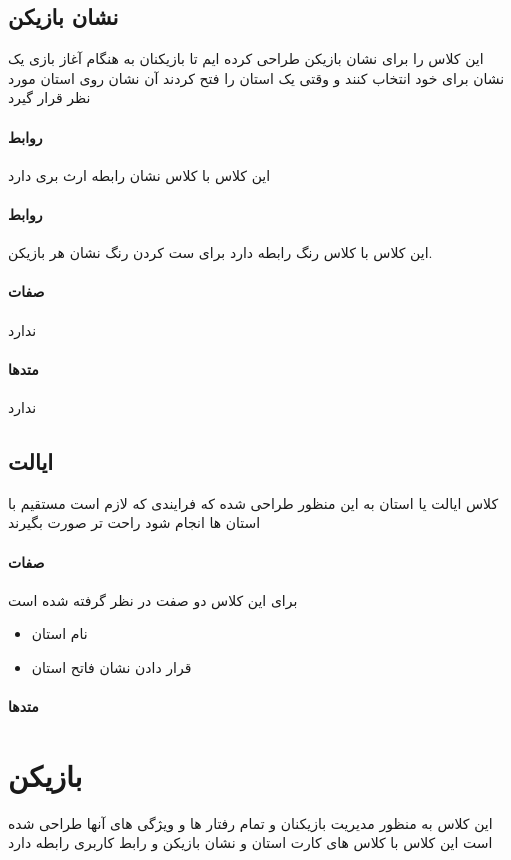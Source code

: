 \documentclass[pdf,titlepage,a4paper]{report}
\begin{document}
	\subsection{نشان بازیکن}
	این کلاس را برای نشان بازیکن طراحی کرده ایم تا بازیکنان به هنگام آغاز بازی یک نشان برای خود انتخاب کنند و وقتی یک استان را فتح کردند آن نشان روی استان مورد نظر قرار گیرد
	\paragraph{روابط}
	 این کلاس با کلاس نشان رابطه ارث بری دارد 
	\paragraph{روابط}
	این کلاس با کلاس رنگ رابطه دارد برای ست کردن رنگ نشان هر بازیکن.\\ 
	\paragraph{صفات}
	ندارد
	\paragraph{متدها}
	ندارد
	
	\subsection{ایالت}
	کلاس ایالت یا استان به این منظور طراحی شده که فرایندی که لازم است مستقیم با استان ها انجام شود راحت تر صورت بگیرند 

	\paragraph{صفات}
	 برای این کلاس دو صفت در نظر گرفته شده است
	 \begin{latin}
	 	\begin{itemize}
	 		\item {} نام استان 
	 		\item {} قرار دادن نشان فاتح استان
	 	\end{itemize}
	 \end{latin}
	\paragraph{متدها}
	
	\section{بازیکن}
	این کلاس به منظور مدیریت بازیکنان و تمام رفتار ها و ویژگی های آنها طراحی شده است 
	 این کلاس با کلاس های کارت استان و نشان بازیکن و رابط کاربری رابطه دارد
\end{document}
